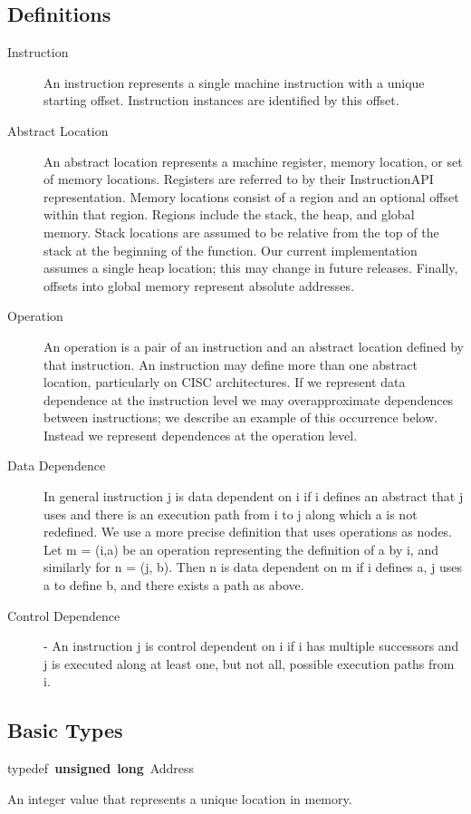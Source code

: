 \documentclass[12pt,titlepage]{article}
\begin{document}
\subsection{Definitions}
\begin{description}
\item[Instruction] An instruction represents a single machine
instruction with a unique starting offset. Instruction instances are
identified by this offset.
\item[Abstract Location] An abstract location represents a machine
register, memory location, or set of memory locations. Registers are
referred to by their InstructionAPI representation. Memory locations
consist of a region and an optional offset within that region. Regions
include the stack, the heap, and global memory. Stack locations are
assumed to be relative from the top of the stack at the beginning of
the function. Our current implementation assumes a single heap
location; this may change in future releases. Finally, offsets into
global memory represent absolute addresses.
\item[Operation] An operation is a pair of an instruction and an
abstract location defined by that instruction. An instruction may
define more than one abstract location, particularly on CISC
architectures. If we represent data dependence at the instruction
level we may overapproximate dependences between instructions; we
describe an example of this occurrence below. Instead we represent
dependences at the operation level.
\item[Data Dependence] In general instruction j is data dependent on i
if i defines an abstract that j uses and there is an execution path
from i to j along which a is not redefined. We use a more precise
definition that uses operations as nodes. Let m = (i,a) be an
operation representing the definition of a by i, and similarly for n =
(j, b). Then n is data dependent on m if i defines a, j uses a to
define b, and there exists a path as above.
\item[Control Dependence] - An instruction j is control dependent on i
if i has multiple successors and j is executed along at least one, but
not all, possible execution paths from i.
\end{description}

\subsection{Basic Types}

{\ttfamily \raggedright \small
typedef\ \textbf{unsigned}\ \textbf{long}\ Address\\
 }
\normalfont\normalsize
\indent An integer value that represents a unique location in memory.
\end{document}
